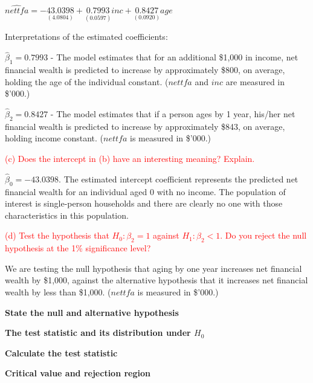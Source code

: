 \documentclass[12pt]{report}
\begin{document}
\vspace{-\baselineskip}
\centering $\widehat{nettfa} = -\underset{(4.0804)}{43.0398} + \underset{(0.0597)}{0.7993}inc + \underset{(0.0920)}{0.8427}age$

\justify \noindent Interpretations of the estimated coefficients:

\noindent $\hat{\beta}_1 = 0.7993$ - The model estimates that for an additional \$1,000 in income, net financial wealth is predicted to increase by approximately \$800, on average, holding the age of the individual constant. ($nettfa$ and $inc$ are measured in \$'000.)

\noindent $\hat{\beta}_2 = 0.8427$ - The model estimates that if a person ages by 1 year, his/her net financial wealth is predicted to increase by approximately \$843, on average, holding income constant. ($nettfa$ is measured in \$'000.)

\noindent \textcolor{red}{(c) Does the intercept in (b) have an interesting meaning? Explain.}

\noindent $\hat{\beta}_0 = -43.0398$. The estimated intercept coefficient represents the predicted net financial wealth for an individual aged 0 with no income. The population of interest is single-person households and there are clearly no one with those characteristics in this population.

\newpage
\noindent \textcolor{red}{(d) Test the hypothesis that $H_0: \beta_2 = 1$ against $H_1: \beta_2 < 1$. Do you reject the null hypothesis at the 1\% significance level?}

\noindent We are testing the null hypothesis that aging by one year increases net financial wealth by \$1,000, against the alternative hypothesis that it increases net financial wealth by less than \$1,000. ($nettfa$ is measured in \$'000.)

\noindent \textbf{State the null and alternative hypothesis}
\vspace{20mm}

\noindent \textbf{The test statistic and its distribution under $H_0$}
\vspace{40mm}

\noindent \textbf{Calculate the test statistic}
\vspace{20mm}

\noindent \textbf{Critical value and rejection region}
\end{document}
